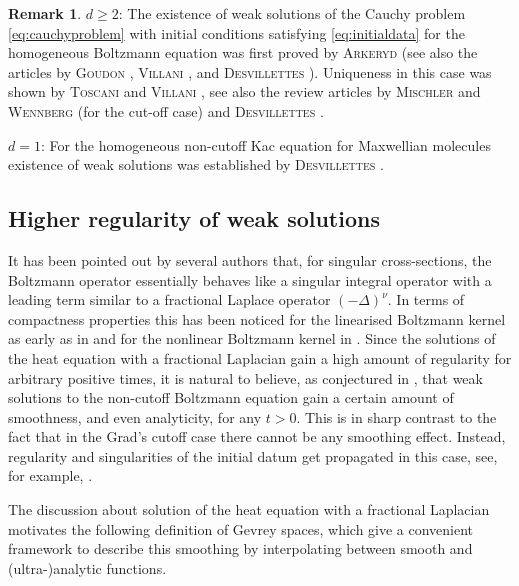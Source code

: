 \documentclass[11pt,a4paper,reqno]{amsart}
\theoremstyle{plain}
\theoremstyle{definition}
\newtheorem{remark}[proposition]{Remark}
\begin{document}
\begin{remark}
$d\geq 2$: The existence of weak solutions of the Cauchy problem \eqref{eq:cauchyproblem} with initial conditions satisfying \eqref{eq:initialdata} for the homogeneous Boltzmann equation was first proved by \textsc{Arkeryd} \cite{Ark72,Ark81} (see also the articles by \textsc{Goudon} \cite{Gou97}, \textsc{Villani} \cite{Vil98}, and \textsc{Desvillettes} \cite{Des01,Des03}). Uniqueness in this case was shown by \textsc{Toscani} and \textsc{Villani} \cite{TV99}, see  also the review articles by \textsc{Mischler} and \textsc{Wennberg} \cite{MW99} (for the cut-off case) and \textsc{Desvillettes} \cite{Des01}.

$d=1$: For the homogeneous non-cutoff Kac equation for Maxwellian molecules existence of weak solutions was established by \textsc{Desvillettes} \cite{Des95}.
\end{remark}

\subsection{Higher regularity of weak solutions}

 It has been pointed out by several authors \cite{Ale09,DW10,Vil02} that, for singular cross-sections, the Boltzmann operator essentially behaves like a singular integral operator with a leading term similar to a fractional Laplace operator $(-\Delta)^{\nu}$.  In terms of compactness properties this has been noticed for the linearised Boltzmann kernel as early as in \cite{Pao74} and for the nonlinear Boltzmann kernel in \cite{Lio94}. Since the solutions of the heat equation with a fractional Laplacian gain a high amount of regularity for arbitrary positive times, it is natural to believe, as conjectured in \cite{DW10}, that weak solutions to the non-cutoff Boltzmann equation gain a certain amount of smoothness, and even analyticity, for any $t>0$.
 	This is in sharp contrast to the fact that in the Grad's cutoff case there cannot be any smoothing effect. Instead, regularity and singularities of the initial datum get propagated in this case, see, for example,
	\cite{MV04}.
	

The discussion about solution of the heat equation with a fractional Laplacian motivates the following definition of Gevrey spaces, which give
    a convenient framework to describe this smoothing by interpolating between smooth  and (ultra-)analytic functions.
\end{document}

